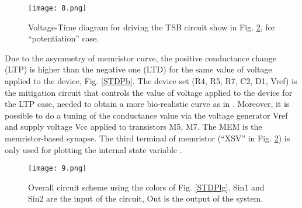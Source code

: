 \documentclass[review]{elsarticle}
\begin{document}
\begin{figure}[!htbp]
\centering
\texttt{[image: 8.png]}
\caption{Voltage-Time diagram for driving the TSB circuit show in Fig. \ref{Block}, for ``potentiation'' case. }
\label{waveform}
\end{figure}
 Due to the asymmetry of memristor curve, the positive conductance change (LTP) is higher than the negative one (LTD) for the same value of voltage applied to the device, Fig. \ref{STDPb}. The device set (R4, R5, R7, C2, D1, Vref) is the mitigation circuit that controls the value of voltage applied to the device for the LTP case, needed to obtain a more bio-realistic curve as in \cite{Bi1998}. Moreover, it is possible to do a tuning of the conductance value via the voltage generator Vref and supply voltage Vcc applied to transistors M5, M7. 
The MEM is the memristor-based synapse. The third terminal of memristor (``XSV'' in Fig. \ref{Block}) is only used for plotting the internal state variable \cite{Yakopcic2011}. 












\begin{figure}[!htbp]
\centering
\texttt{[image: 9.png]}
\caption{Overall circuit scheme using the colors of Fig. \ref{STDPlg}. Sin1 and Sin2 are the input of the circuit, Out is the output of the system.}
\label{Block}
\end{figure}
\end{document}

